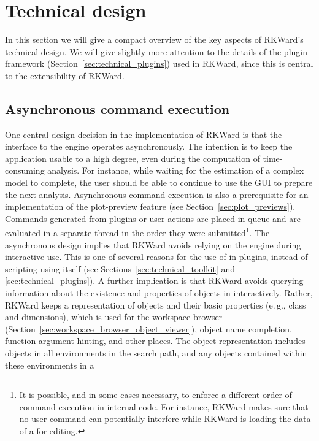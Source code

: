 \section{Technical design}
\label{sec:technical}
In this section we will give a compact overview of the key aspects of RKWard's
technical design. We will give slightly more attention to the details of the
plugin framework (Section~\ref{sec:technical_plugins}) used in RKWard, since this is central to the extensibility of
RKWard.

\subsection{Asynchronous command execution}
\label{sec:technical_asynchronous}
One central design decision in the implementation of RKWard is that the
interface to the  engine operates asynchronously. The intention is to
keep the application usable to a high degree, even during the computation of
time-consuming analysis. For instance, while waiting for the estimation of a
complex model to complete, the user should be able to continue to use the GUI to
prepare the next analysis. Asynchronous command execution is also a prerequisite
for an implementation of the plot-preview feature (see Section~\ref{sec:plot_previews}). Commands
generated from plugins or user actions are placed in queue and are evaluated in
a separate thread in the order they were submitted\footnote{
    It is possible, and in some cases necessary, to enforce a different order of command execution in
    internal code. For instance, RKWard makes sure that no user command can
    potentially interfere while RKWard is loading the data of a  for
    editing.
}. The asynchronous design implies that RKWard avoids relying on the
 engine during interactive use. This is one of several reasons for
the use of  in plugins, instead of scripting using
 itself (see Sections~\ref{sec:technical_toolkit} and \ref{sec:technical_plugins}).
A further implication is that RKWard avoids querying information about the
existence and properties of objects in  interactively. Rather,
RKWard keeps a representation of  objects and their basic properties
(e.\,g., class and dimensions), which is used for the workspace browser (Section~\ref{sec:workspace_browser_object_viewer}),
object name completion, function argument hinting, and
other places. The object representation includes objects in all environments
in the search path, and any objects contained within these environments in a
